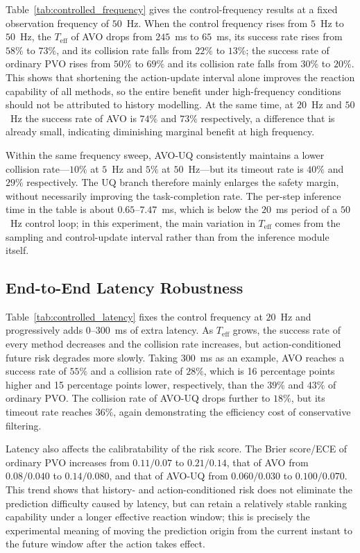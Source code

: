\documentclass[10pt,a4paper,twocolumn]{article}
\begin{document}
Table~\ref{tab:controlled_frequency} gives the control-frequency results at a fixed observation frequency of $50$~Hz. When the control frequency rises from $5$~Hz to $50$~Hz, the $T_{\mathrm{eff}}$ of AVO drops from $245$~ms to $65$~ms, its success rate rises from $58\%$ to $73\%$, and its collision rate falls from $22\%$ to $13\%$; the success rate of ordinary PVO rises from $50\%$ to $69\%$ and its collision rate falls from $30\%$ to $20\%$. This shows that shortening the action-update interval alone improves the reaction capability of all methods, so the entire benefit under high-frequency conditions should not be attributed to history modelling. At the same time, at $20$~Hz and $50$~Hz the success rate of AVO is $74\%$ and $73\%$ respectively, a difference that is already small, indicating diminishing marginal benefit at high frequency.

Within the same frequency sweep, AVO-UQ consistently maintains a lower collision rate---$10\%$ at $5$~Hz and $5\%$ at $50$~Hz---but its timeout rate is $40\%$ and $29\%$ respectively. The UQ branch therefore mainly enlarges the safety margin, without necessarily improving the task-completion rate. The per-step inference time in the table is about $0.65$--$7.47$~ms, which is below the $20$~ms period of a $50$~Hz control loop; in this experiment, the main variation in $T_{\mathrm{eff}}$ comes from the sampling and control-update interval rather than from the inference module itself.

\subsection{End-to-End Latency Robustness}

Table~\ref{tab:controlled_latency} fixes the control frequency at $20$~Hz and progressively adds $0$--$300$~ms of extra latency. As $T_{\mathrm{eff}}$ grows, the success rate of every method decreases and the collision rate increases, but action-conditioned future risk degrades more slowly. Taking $300$~ms as an example, AVO reaches a success rate of $55\%$ and a collision rate of $28\%$, which is 16 percentage points higher and 15 percentage points lower, respectively, than the $39\%$ and $43\%$ of ordinary PVO. The collision rate of AVO-UQ drops further to $18\%$, but its timeout rate reaches $36\%$, again demonstrating the efficiency cost of conservative filtering.

Latency also affects the calibratability of the risk score. The Brier score/ECE of ordinary PVO increases from $0.11/0.07$ to $0.21/0.14$, that of AVO from $0.08/0.040$ to $0.14/0.080$, and that of AVO-UQ from $0.060/0.030$ to $0.100/0.070$. This trend shows that history- and action-conditioned risk does not eliminate the prediction difficulty caused by latency, but can retain a relatively stable ranking capability under a longer effective reaction window; this is precisely the experimental meaning of moving the prediction origin from the current instant to the future window after the action takes effect.
\end{document}
